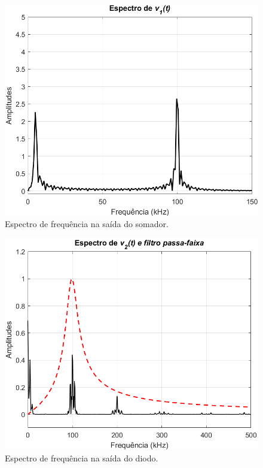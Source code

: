 \documentclass[a4paper,12pt,oneside,openany,table,xcdraw]{article}
\begin{document}
\vspace{0.3cm}
\begin{figure}[H]
\centering
\includegraphics[width=\textwidth]{ex1_espectro_v1}
\caption{Espectro de frequência na saída do somador.}
\label{1:fft:v1}
\end{figure}

\vspace{0.3cm}
\begin{figure}[H]
\centering
\includegraphics[width=\textwidth]{ex1_espectro_v2}
\caption{Espectro de frequência na saída do diodo.}
\label{1:fft:v2}
\end{figure}
\end{document}
